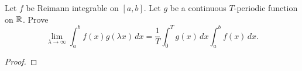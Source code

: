 \documentclass[../hw5]{subfiles}
\begin{document}
\begin{problem}
Let $f$ be Reimann integrable on  $[a,b]$.
Let $g$ be a continuous  $T$-periodic function on  $\mathbb{R}$.
Prove \[
	\lim_{\lambda \to \infty} \int_{a}^{b} f(x)g(\lambda x) \,dx = \frac{1}{T}\int_{0}^{T}g(x)\,dx \int_{a}^{b} f(x) \,dx
	.\]
\end{problem}
\begin{proof}

\end{proof}
\end{document}

